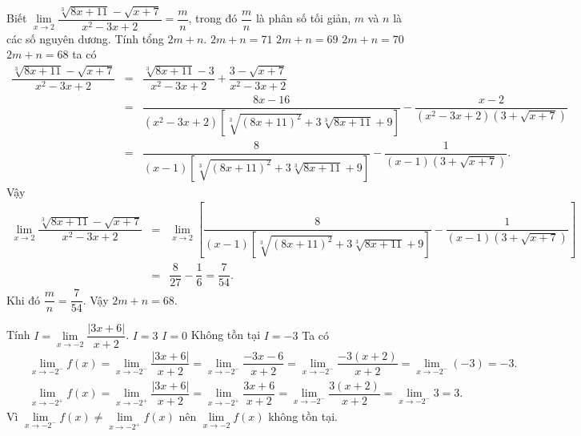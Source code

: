 \begin{ex}%
 Biết $\lim\limits_{x \to 2}\dfrac{\sqrt[3]{8x+11} - \sqrt{x+7}}{x^2-3x+2}=\dfrac{m}{n}$, trong đó $\dfrac{m}{n}$ là phân số tối giản, $m$ và $n$ là các số nguyên dương. Tính tổng $2m+n$.
 \choice
  {$2m+n=71$}
  {$2m+n=69$}
  {$2m+n=70$}
  {\True $2m+n=68$}
 \loigiai
  {
  ta có
  \begin{eqnarray*}
   \dfrac{\sqrt[3]{8x+11} - \sqrt{x+7}}{x^2-3x+2} &=& \dfrac{\sqrt[3]{8x+11} - 3}{x^2-3x+2} + \dfrac{3 - \sqrt{x+7}}{x^2-3x+2}\\
   &=& \dfrac{8x-16}{(x^2-3x+2)\left[\sqrt[3]{(8x+11)^2} + 3\sqrt[3]{8x+11} + 9 \right]} - \dfrac{x-2}{(x^2-3x+2)\left(3+\sqrt{x+7} \right)}\\
   &=& \dfrac{8}{(x-1)\left[\sqrt[3]{(8x+11)^2} + 3\sqrt[3]{8x+11} + 9 \right]} - \dfrac{1}{(x-1)\left(3+\sqrt{x+7} \right)}.
  \end{eqnarray*}
  Vậy
  \begin{eqnarray*}
   \lim\limits_{x \to 2}\dfrac{\sqrt[3]{8x+11} - \sqrt{x+7}}{x^2-3x+2} &=& \lim\limits_{x \to 2} \left[ \dfrac{8}{(x-1)\left[\sqrt[3]{(8x+11)^2} + 3\sqrt[3]{8x+11} + 9 \right]} - \dfrac{1}{(x-1)\left(3+\sqrt{x+7} \right)} \right] \\
   &=& \dfrac{8}{27} - \dfrac{1}{6} = \dfrac{7}{54}.
  \end{eqnarray*}
  Khi đó $\dfrac{m}{n} = \dfrac{7}{54}$. Vậy $2m+n=68$.
  }
\end{ex}
\begin{ex}%
 Tính $I = \lim\limits_{x \to -2}\dfrac{|3x+6|}{x+2}$.
 \choice
  {$I = 3$}
  {$I = 0$}
  {\True Không tồn tại}
  {$I = -3$}
 \loigiai
  {
  Ta có
  \allowdisplaybreaks
  \begin{eqnarray*}
   & & \lim\limits_{x \to -2^-} f(x) = \lim\limits_{x \to -2^-}\dfrac{|3x+6|}{x+2} = \lim\limits_{x \to -2^-}\dfrac{-3x-6}{x+2} = \lim\limits_{x \to -2^-}\dfrac{-3(x+2)}{x+2} = \lim\limits_{x \to -2^-}(-3) = -3.\\
   & & \lim\limits_{x \to -2^+} f(x) = \lim\limits_{x \to -2^+}\dfrac{|3x+6|}{x+2} = \lim\limits_{x \to -2^+}\dfrac{3x+6}{x+2} = \lim\limits_{x \to -2^-}\dfrac{3(x+2)}{x+2} = \lim\limits_{x \to -2^-}3 = 3.
  \end{eqnarray*}
  Vì $\lim\limits_{x \to -2^-} f(x) \neq \lim\limits_{x \to -2^+} f(x)$ nên $\lim\limits_{x \to -2} f(x)$ không tồn tại.
  }
\end{ex}
